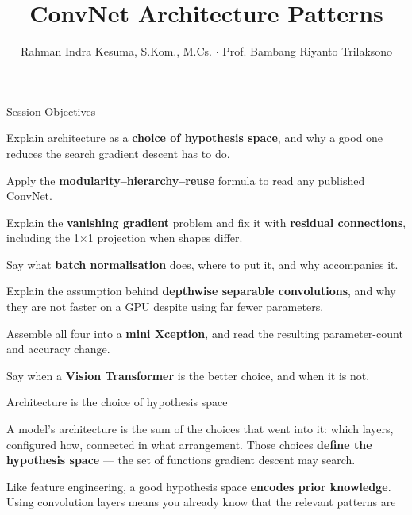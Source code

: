 \documentclass[aspectratio=169,11pt,t]{beamer}
\title{ConvNet Architecture Patterns}
\author{Rahman Indra Kesuma, S.Kom., M.Cs. $\cdot$ Prof. Bambang Riyanto Trilaksono}
\date{}
\begin{document}
\covertitle

\begin{frame}[shrink=25]{Session Objectives}
\begin{isteps}
\item Explain architecture as a \textbf{choice of hypothesis space}, and why a good one reduces the search gradient descent has to do.
\item Apply the \textbf{modularity--hierarchy--reuse} formula to read any published ConvNet.
\item Explain the \textbf{vanishing gradient} problem and fix it with \textbf{residual connections}, including the 1$\times$1 projection when shapes differ.
\item Say what \textbf{batch normalisation} does, where to put it, and why  accompanies it.
\item Explain the assumption behind \textbf{depthwise separable convolutions}, and why they are not faster on a GPU despite using far fewer parameters.
\item Assemble all four into a \textbf{mini Xception}, and read the resulting parameter-count and accuracy change.
\item Say when a \textbf{Vision Transformer} is the better choice, and when it is not.
\end{isteps}

\vskip 6pt
\vskip 4pt
\vskip 2pt
\end{frame}

\begin{frame}[shrink=25]{Architecture is the choice of hypothesis space}
{\fontsize{9.4}{12.6}\selectfont\color{fg2}A model's architecture is the sum of the choices that went into it: which layers, configured how, connected in what arrangement. Those choices \textbf{define the hypothesis space} --- the set of functions gradient descent may search.\par}\vskip 4pt
\begin{iband}[signal]
Like feature engineering, a good hypothesis space \textbf{encodes prior knowledge}. Using convolution layers means you already know that the relevant patterns are 
\end{iband}
\end{frame}
\end{document}
